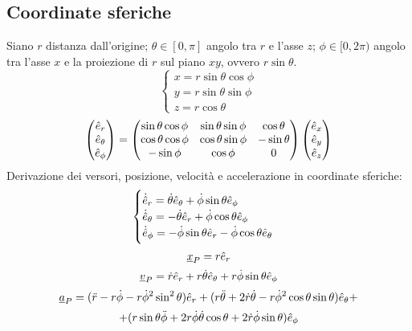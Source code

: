 \documentclass[11pt,landscape]{article}
\begin{document}
\begin{multicols}{3}
    \subsection{Coordinate sferiche}
        Siano $r$ distanza dall'origine; $\theta \in [0,\pi]$ angolo tra $r$ e l'asse $z$; $\phi \in [0, 2\pi)$ angolo tra l'asse $x$ e la proiezione di $r$ sul piano $xy$, ovvero $r \sin \theta$.
        $$\begin{cases}
            x = r \sin \theta \cos \phi \\
            y = r \sin \theta \sin \phi \\
            z = r \cos \theta
        \end{cases}$$
        $$\begin{pmatrix} \hat{e}_r \\ \hat{e}_\theta \\ \hat{e}_\phi \end{pmatrix} = 
        \begin{pmatrix}
            \sin \theta \cos \phi & \sin \theta \sin \phi & \cos \theta \\
            \cos \theta \cos \phi & \cos \theta \sin \phi & -\sin \theta \\
            - \sin \phi & \cos \phi & 0
        \end{pmatrix}
        \begin{pmatrix} \hat{e}_x \\\hat{e}_y \\\hat{e}_z \end{pmatrix}$$
        Derivazione dei versori, posizione, velocità e accelerazione in coordinate sferiche:
            $$\begin{cases}
                \dot{\hat{e}}_r = \dot{\theta}\hat{e}_\theta + \dot{\phi}\sin\theta \hat{e}_\phi\\
                \dot{\hat{e}}_\theta = -\dot{\theta}\hat{e}_r + \dot{\phi}\cos \theta \hat{e}_\phi\\
                \dot{\hat{e}}_\phi = -\dot{\phi}\sin \theta \hat{e}_r - \dot{\phi}\cos \theta \hat{e}_\theta
            \end{cases}
            $$
            $$ \underline{x}_P = r\hat{e}_r$$
            $$ \underline{v}_P = \dot{r} \hat{e}_r + r\dot{\theta}\hat{e}_\theta + r\dot{\phi}\sin \theta \hat{e}_\phi$$
            $$ \underline{a}_P = (\ddot{r} - r\dot{\phi} - r\dot{\phi}^2 \sin^2 \theta )\hat{e}_r + (r\ddot{\theta} + 2\dot{r}\dot{\theta} - r\dot{\phi}^2 \cos \theta \sin \theta ) \hat{e}_\theta +$$ $$ + (r\sin\theta \ddot{\phi} + 2r \dot{\phi} \dot{\theta} \cos \theta  + 2 \dot{r} \dot{\phi} \sin \theta)\hat{e}_\phi $$

\end{multicols}
\end{document}
